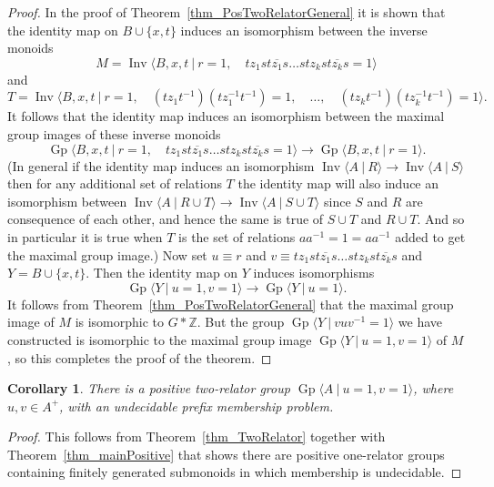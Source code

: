 \documentclass{amsart}
\newcommand{\Gpres}[2]{\operatorname{Gp}\bigl\langle #1\:|\:#2 \bigr\rangle}
\newcommand{\Ipres}[2]{\operatorname{Inv}\bigl\langle #1\:|\:#2 \bigr\rangle}
\theoremstyle{plain}
\newtheorem{cor}[theorem]{Corollary}
\theoremstyle{definition}
\begin{document}
\begin{proof}
In the proof of Theorem~\ref{thm_PosTwoRelatorGeneral} it is shown that the identity map on $B\cup\{x,t\}$ induces an isomorphism between the inverse monoids 
\[
M = \Ipres{B,x,t}{
r = 1, \quad 
t z_1 s t\overline{z_1} s  \ldots  s t z_k s t\overline{z_k} s = 1
}
\]
and 
\[
T = \Ipres{B,x,t}{
r= 1, \quad 
(t z_1 t^{-1}) (t z_1^{-1} t^{-1}) = 1, \quad 
\ldots, \quad  
(t z_k t^{-1}) (t z_k^{-1} t^{-1}) = 1
}.
\]
It follows that the identity map induces an isomorphism between the maximal group images of these inverse monoids 
\[
\Gpres{B,x,t}{
r = 1, \quad 
t z_1 s t\overline{z_1} s  \ldots  s t z_k s t\overline{z_k} s = 1
}
\rightarrow 
\Gpres{B,x,t}{r=1}. 
\]
(In general if the identity map induces an isomorphism $\Ipres{A}{R} \rightarrow \Ipres{A}{S}$ then for any additional set of relations $T$ the identity map will also induce an isomorphism between $\Ipres{A}{R \cup T} \rightarrow \Ipres{A}{S \cup T}$ since $S$ and $R$ are consequence of each other, and hence the same is true of $S \cup T$ and $R \cup T$. And so in particular it is true when $T$ is the set of relations $aa^{-1}= 1 = aa^{-1}$ added to get the maximal group image.)         
Now set $u \equiv r$ and $v \equiv t z_1 s t\overline{z_1} s  \ldots  s t z_k s t\overline{z_k} s $ and $Y = B \cup \{x,t\}$. Then the identity map on $Y$ induces isomorphisms 
\[
\Gpres{Y}{u=1,v=1} \rightarrow \Gpres{Y}{u=1}. 
\] 
It follows from Theorem~\ref{thm_PosTwoRelatorGeneral} that the maximal group image of $M$ is isomorphic to $G \ast \mathbb{Z}$. But the group  $\Gpres{Y}{vuv^{-1}=1}$ we have constructed is isomorphic to the maximal group image  $\Gpres{Y}{u=1,v=1}$ of $M$, so this completes the proof of the theorem.  
  \end{proof}

\begin{cor}\label{cor_TwoRelator} 
There is a positive two-relator group $\Gpres{A}{u=1, v=1}$, where $u, v \in A^+$, with an undecidable prefix membership problem. 
  \end{cor}
\begin{proof} 
This follows from Theorem~\ref{thm_TwoRelator} together with Theorem~\ref{thm_mainPositive} that shows there are positive one-relator groups containing finitely generated submonoids in which membership is undecidable. 
\end{proof}
\end{document}
